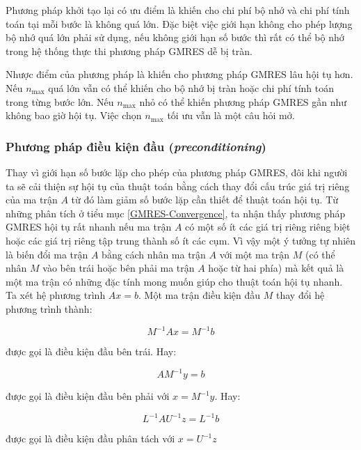 \documentclass[14pt, a4paper]{article}
\numberwithin{equation}{section}
\numberwithin{algorithm}{section}
\numberwithin{figure}{section}
\numberwithin{dl}{section}
\numberwithin{md}{section}
\numberwithin{bd}{section}
\numberwithin{dn}{section}
\numberwithin{hq}{section}
\begin{document}
Phương pháp khởi tạo lại có ưu điểm là khiến cho chi phí bộ nhớ và chi phí tính toán tại mỗi bước là không quá lớn. Đặc biệt việc giới hạn không cho phép lượng bộ nhớ quá lớn phải sử dụng, nếu không giới hạn số bước thì rất có thể bộ nhớ trong hệ thống thực thi phương pháp GMRES dễ bị tràn.

Nhược điểm của phương pháp là khiến cho phương pháp GMRES lâu hội tụ hơn. Nếu $n_{\max}$ quá lớn vẫn có thể khiến cho bộ nhớ bị tràn hoặc chi phí tính toán trong từng bước lớn. Nếu $n_{\max}$ nhỏ có thể khiến phương pháp GMRES gần như không bao giờ hội tụ. Việc chọn $n_{\max}$ tối ưu vẫn là một câu hỏi mở.

\subsubsection{Phương pháp điều kiện đầu (\textit{preconditioning})} \label{GMRES-Precondition}

Thay vì giới hạn số bước lặp cho phép của phương pháp GMRES, đôi khi người ta sẽ cải thiện sự hội tụ của thuật toán bằng cách thay đổi cấu trúc giá trị riêng của ma trận $A$ từ đó làm giảm số bước lặp cần thiết để thuật toán hội tụ.
Từ những phân tích ở tiểu mục \ref{GMRES-Convergence}, ta nhận thấy phương pháp GMRES hội tụ rất nhanh nếu ma trận $A$ có một số ít các giá trị riêng riêng biệt hoặc các giá trị riêng tập trung thành số ít các cụm. Vì vậy một ý tưởng tự nhiên là biến đổi ma trận $A$ bằng cách nhân ma trận $A$ với một ma trận $M$ (có thể nhân $M$ vào bên trái hoặc bên phải ma trận $A$ hoặc từ hai phía) mà kết quả là một ma trận có những đặc tính mong muốn giúp cho thuật toán hội tụ nhanh.
Ta xét hệ phương trình $Ax=b$. Một ma trận điều kiện đầu $M$ thay đổi hệ phương trình thành:

\begin{equation}
    M^{-1}Ax = M^{-1}b
\end{equation}

được gọi là điều kiện đầu bên trái. Hay:

\begin{equation}
    AM^{-1}y = b
\end{equation}

được gọi là điều kiện đầu bên phải với $x=M^{-1}y$. Hay:

\begin{equation}
    L^{-1}AU^{-1}z = L^{-1}b
\end{equation}

được gọi là điều kiện đầu phân tách với $x=U^{-1}z$
\end{document}
